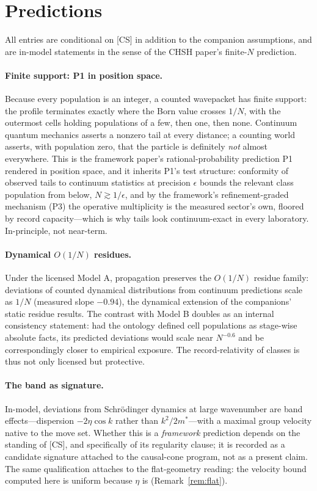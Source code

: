\documentclass[11pt]{article}
\theoremstyle{definition}
\theoremstyle{remark}
\begin{document}
\section{Predictions}\label{sec:pred}
All entries are conditional on [CS] in addition to the companion assumptions, and are in-model statements in the sense of the CHSH paper's finite-$N$ prediction.

\paragraph{Finite support: P1 in position space.} Because every population is an integer, a counted wavepacket has finite support: the profile terminates exactly where the Born value crosses $1/N$, with the outermost cells holding populations of a few, then one, then none. Continuum quantum mechanics asserts a nonzero tail at every distance; a counting world asserts, with population zero, that the particle is definitely \emph{not} almost everywhere. This is the framework paper's rational-probability prediction P1 rendered in position space, and it inherits P1's test structure: conformity of observed tails to continuum statistics at precision $\epsilon$ bounds the relevant class population from below, $N \gtrsim 1/\epsilon$, and by the framework's refinement-graded mechanism (P3) the operative multiplicity is the measured sector's own, floored by record capacity---which is why tails look continuum-exact in every laboratory. In-principle, not near-term.

\paragraph{Dynamical $O(1/N)$ residues.} Under the licensed Model A, propagation preserves the $O(1/N)$ residue family: deviations of counted dynamical distributions from continuum predictions scale as $1/N$ (measured slope $-0.94$), the dynamical extension of the companions' static residue results. The contrast with Model B doubles as an internal consistency statement: had the ontology defined cell populations as stage-wise absolute facts, its predicted deviations would scale near $N^{-0.6}$ and be correspondingly closer to empirical exposure. The record-relativity of classes is thus not only licensed but protective.

\paragraph{The band as signature.} In-model, deviations from Schr\"odinger dynamics at large wavenumber are band effects---dispersion $-2\eta\cos k$ rather than $k^2/2m^\ast$---with a maximal group velocity native to the move set. Whether this is a \emph{framework} prediction depends on the standing of [CS], and specifically of its regularity clause; it is recorded as a candidate signature attached to the causal-cone program, not as a present claim. The same qualification attaches to the flat-geometry reading: the velocity bound computed here is uniform because $\eta$ is (Remark~\ref{rem:flat}).
\end{document}

